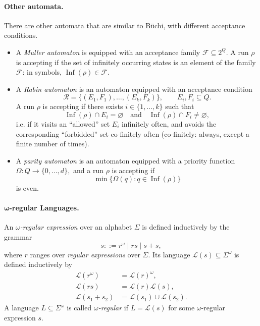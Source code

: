 \documentclass[11pt,a4paper]{tutorial}
\newcommand{\Lang}{\mathcal{L}}
\let\L=\Lang
\begin{document}
\paragraph{Other automata.}
There are other automata that are similar to Büchi,
with different acceptance conditions.
\begin{itemize}[leftmargin=*]
\item A \emph{Muller automaton} is equipped with an
acceptance family
\(
\mathcal F\subseteq 2^Q
\).
A run $\rho$ is accepting if
the set of infinitely occurring states is an element of the family $\mathcal F$: 
in symbols, \(\operatorname{Inf}(\rho)\in\mathcal F\).

\item A \emph{Rabin automaton} is an automaton equipped with an
acceptance condition
\[
\mathcal R=\{(E_1,F_1),\ldots,(E_k,F_k)\},
\qquad E_i,F_i\subseteq Q.
\]
A run $\rho$ is accepting if there exists $i\in\{1,\ldots,k\}$
such that
\[
\operatorname{Inf}(\rho)\cap E_i=\varnothing
\quad
\text{and}
\quad
\operatorname{Inf}(\rho)\cap F_i\ne\varnothing,
\]
i.e. if it visits an ``allowed'' set $E_i$ infinitely often,
and avoids the corresponding ``forbidded'' set co-finitely often 
(co-finitely: always, except a finite number of times).

\item A \emph{parity automaton} is an automaton equipped with a priority
function
\(
\Omega:Q\longrightarrow\{0,\ldots,d\},
\)
and a run $\rho$ is accepting if
\[
\min\{\Omega(q):q\in\operatorname{Inf}(\rho)\}
\]
is even.
\end{itemize}

\paragraph{$\symbf\omega$-regular Languages.}
An \emph{$\omega$-regular expression} over an alphabet $\Sigma$ is
defined inductively by the grammar
\[
s ::= r^\omega \mid rs \mid s+s,
\]
where $r$ ranges over \emph{regular expressions} over $\Sigma$.
Its language $\L(s)\subseteq\Sigma^\omega$ is defined inductively by
\[
\begin{aligned}
\L(r^\omega) &= \L(r)^\omega,\\
\L(rs)       &= \L(r)\L(s),\\
\L(s_1+s_2)  &= \L(s_1)\cup\L(s_2).
\end{aligned}
\]
A language $L\subseteq\Sigma^\omega$ is called \emph{$\omega$-regular}
if $L=\L(s)$ for some $\omega$-regular expression $s$.
\end{document}
